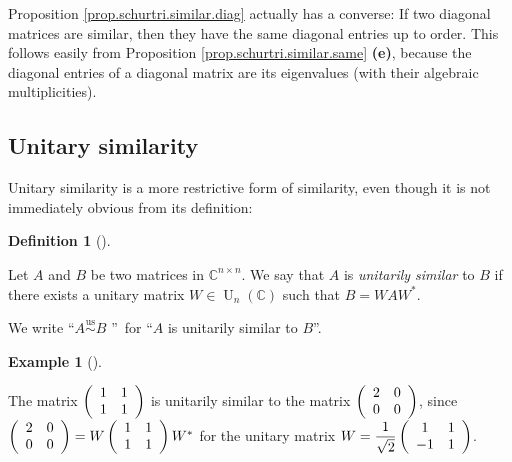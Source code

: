 \documentclass[numbers=enddot,12pt,final,onecolumn,notitlepage]{scrartcl}%
\numberwithin{exer}{subsection}
\theoremstyle{definition}
\newtheorem{defi}[theo]{Definition}
\newenvironment{definition}[1][]
{\begin{defi}[#1]\begin{leftbar}}
{\end{leftbar}\end{defi}}
\newtheorem{exam}[theo]{Example}
\newenvironment{example}[1][]
{\begin{exam}[#1]\begin{leftbar}}
{\end{leftbar}\end{exam}}
\begin{document}
Proposition \ref{prop.schurtri.similar.diag} actually has a converse: If two
diagonal matrices are similar, then they have the same diagonal entries up to
order. This follows easily from Proposition \ref{prop.schurtri.similar.same}
\textbf{(e)}, because the diagonal entries of a diagonal matrix are its
eigenvalues (with their algebraic multiplicities).

\subsection{Unitary similarity}

Unitary similarity is a more restrictive form of similarity, even though it is
not immediately obvious from its definition:

\begin{definition}
\label{def.schurtri.unisim.def}Let $A$ and $B$ be two matrices in
$\mathbb{C}^{n\times n}$. We say that $A$ is \emph{unitarily similar} to $B$
if there exists a unitary matrix $W\in\operatorname*{U}\nolimits_{n}\left(
\mathbb{C}\right)  $ such that $B=WAW^{\ast}$.

We write \textquotedblleft$A\overset{\operatorname*{us}}{\sim}B$%
\textquotedblright\ for \textquotedblleft$A$ is unitarily similar to
$B$\textquotedblright.
\end{definition}

\begin{example}
The matrix $\left(
\begin{array}
[c]{cc}%
1 & 1\\
1 & 1
\end{array}
\right)  $ is unitarily similar to the matrix $\left(
\begin{array}
[c]{cc}%
2 & 0\\
0 & 0
\end{array}
\right)  $, since $\left(
\begin{array}
[c]{cc}%
2 & 0\\
0 & 0
\end{array}
\right)  =W\left(
\begin{array}
[c]{cc}%
1 & 1\\
1 & 1
\end{array}
\right)  W^{\ast}$ for the unitary matrix $W=\dfrac{1}{\sqrt{2}}\left(
\begin{array}
[c]{cc}%
1 & 1\\
-1 & 1
\end{array}
\right)  $.
\end{example}
\end{document}
